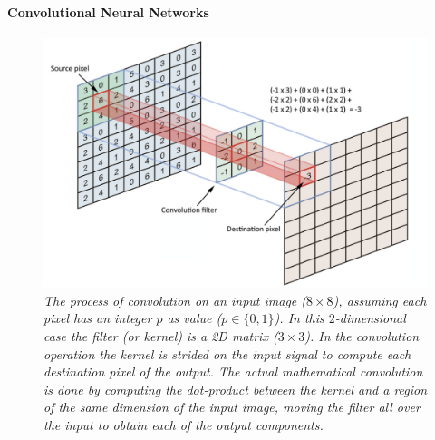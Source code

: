 \documentclass[binding=0.6cm]{sapthesis}
\begin{document}

\paragraph{Convolutional Neural Networks}
\label{sec:bg.gnn.cnn}
\begin{figure}[t]
    \includegraphics[width=\textwidth]{imgs/background/convolution_op.png}
    \caption{\textit{The process of convolution on an input image ($8 \times 8$), assuming each pixel has an integer $p$ as value ($p \in \{0,1\}$). In this $2$-dimensional case the filter (or kernel) is a 2D matrix ($3\times3$). In the convolution operation the kernel is strided on the input signal to compute each destination pixel of the output. The actual mathematical convolution is done by computing the dot-product between the kernel and a region of the same dimension of the input image, moving the filter all over the input to obtain each of the output components.}}
    \label{fig:bg.convolution}
\end{figure}
\end{document}
